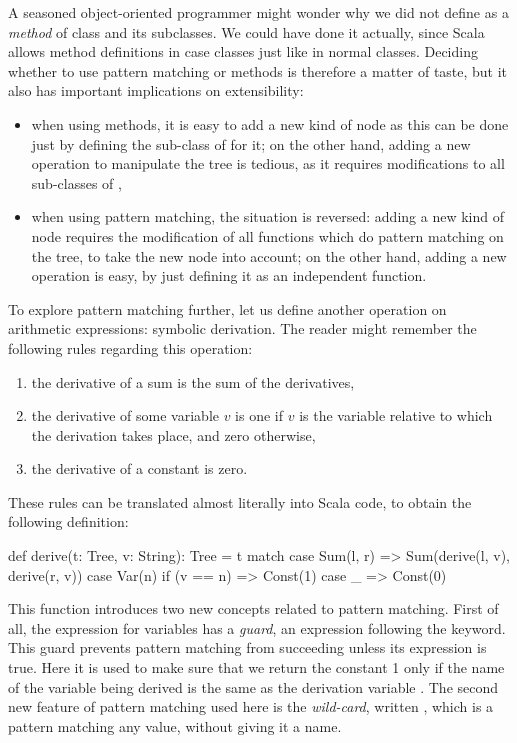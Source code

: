 \documentclass[a4paper,12pt,twoside,titlepage]{article}
\newcommand{\langname}[1]{#1\xspace}
\newcommand{\Scala}{\langname{Scala}}
\begin{document}
A seasoned object-oriented programmer might wonder why we did not
define  as a \emph{method} of class  and its
subclasses. We could have done it actually, since \Scala allows method
definitions in case classes just like in normal classes. Deciding
whether to use pattern matching or methods is therefore a matter of
taste, but it also has important implications on extensibility:
\begin{itemize}
\item when using methods, it is easy to add a new kind of node as this
  can be done just by defining the sub-class of  for it; on
  the other hand, adding a new operation to manipulate the tree is
  tedious, as it requires modifications to all sub-classes of
  ,
\item when using pattern matching, the situation is reversed: adding a
  new kind of node requires the modification of all functions which do
  pattern matching on the tree, to take the new node into account; on
  the other hand, adding a new operation is easy, by just defining it
  as an independent function.
\end{itemize}

To explore pattern matching further, let us define another operation
on arithmetic expressions: symbolic derivation. The reader might
remember the following rules regarding this operation:
\begin{enumerate}
\item the derivative of a sum is the sum of the derivatives,
\item the derivative of some variable $v$ is one if $v$ is the
  variable relative to which the derivation takes place, and zero
  otherwise,
\item the derivative of a constant is zero.
\end{enumerate}
These rules can be translated almost literally into \Scala code, to
obtain the following definition:
\begin{scalacode}
  def derive(t: Tree, v: String): Tree = t match {
    case Sum(l, r) => Sum(derive(l, v), derive(r, v))
    case Var(n) if (v == n) => Const(1)
    case _ => Const(0)
  }
\end{scalacode}
This function introduces two new concepts related to pattern matching.
First of all, the  expression for variables has a
\emph{guard}, an expression following the  keyword. This
guard prevents pattern matching from succeeding unless its expression
is true. Here it is used to make sure that we return the constant 1
only if the name of the variable being derived is the same as the
derivation variable . The second new feature of pattern
matching used here is the \emph{wild-card}, written \code{_}, which is
a pattern matching any value, without giving it a name.
\end{document}
